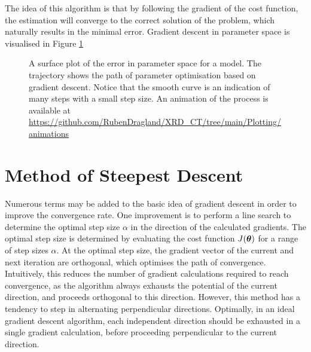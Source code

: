 The idea of this algorithm is that by following the gradient of the cost function,
the estimation will converge to the correct solution of the problem,
which naturally results in the minimal error.
Gradient descent in parameter space is visualised in Figure \ref{fig:GD_surface}

\begin{figure}[h!]
    \centering
    
    \caption[Trajectory of Gradient Descent]{A surface plot of the error in parameter space for a model. The trajectory shows the path of parameter optimisation based on gradient descent.
        Notice that the smooth curve is an indication of many steps with a small step size. An animation of the process is available at \url{https://github.com/RubenDragland/XRD_CT/tree/main/Plotting/animations} %
    }
    \label{fig:GD_surface}
\end{figure}


\section{Method of Steepest Descent}\label{sec:theory_MSD}
Numerous terms may be added to the basic idea of gradient descent in order to improve the convergence rate.
One improvement is to perform a line search to determine the optimal step size $\alpha$ in the direction of the calculated gradients.
The optimal step size is determined by evaluating the cost function $J(\mathrm{\boldsymbol{\theta}})$ for a range of step sizes $\alpha$.
At the optimal step size, the gradient vector of the current and next iteration are orthogonal, which optimises the path of convergence.  %
Intuitively, this reduces the number of gradient calculations required to reach convergence, as the algorithm always exhausts the potential of the current direction, and proceeds orthogonal to this direction.
However, this method has a tendency to step in alternating perpendicular directions. Optimally, in an ideal gradient descent algorithm,
each independent direction should be exhausted in a single gradient calculation, before proceeding perpendicular to the current direction.


